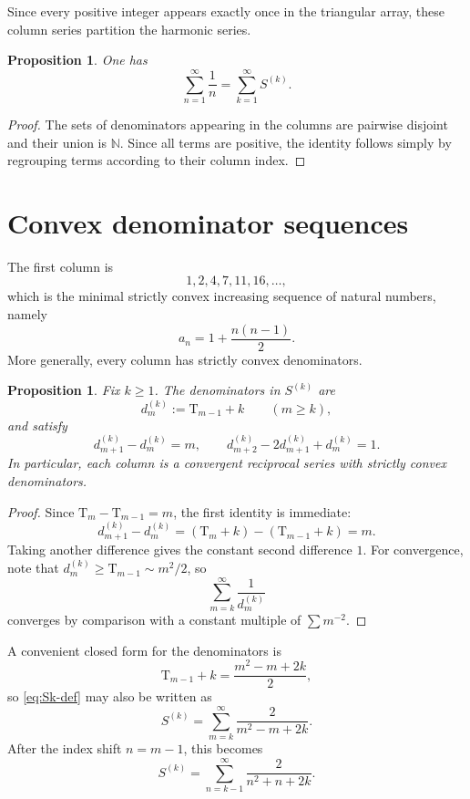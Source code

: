 \documentclass{article}
\theoremstyle{theorem}
\newtheorem{proposition}[theorem]{Proposition}
\theoremstyle{definition}
\newcommand{\N}{\mathbb{N}}
\newcommand{\T}{\mathrm{T}}
\begin{document}
Since every positive integer appears exactly once in the triangular array, these column series partition the harmonic series.

\begin{proposition}\label{prop:partition}
One has
\[
\sum_{n=1}^{\infty} \frac{1}{n} = \sum_{k=1}^{\infty} S^{(k)}.
\]
\end{proposition}

\begin{proof}
The sets of denominators appearing in the columns are pairwise disjoint and their union is $\N$. Since all terms are positive, the identity follows simply by regrouping terms according to their column index.
\end{proof}

\section{Convex denominator sequences}

The first column is
\[
1,2,4,7,11,16,\dots,
\]
which is the minimal strictly convex increasing sequence of natural numbers, namely
\[
a_n = 1 + \frac{n(n-1)}{2}.
\]
More generally, every column has strictly convex denominators.

\begin{proposition}\label{prop:convex}
Fix $k \ge 1$. The denominators in $S^{(k)}$ are
\[
d_m^{(k)} := \T_{m-1}+k \qquad (m \ge k),
\]
and satisfy
\[
d_{m+1}^{(k)} - d_m^{(k)} = m, \qquad d_{m+2}^{(k)} - 2d_{m+1}^{(k)} + d_m^{(k)} = 1.
\]
In particular, each column is a convergent reciprocal series with strictly convex denominators.
\end{proposition}

\begin{proof}
Since $\T_m-\T_{m-1}=m$, the first identity is immediate:
\[
d_{m+1}^{(k)} - d_m^{(k)} = (\T_m+k)-(\T_{m-1}+k)=m.
\]
Taking another difference gives the constant second difference $1$. For convergence, note that $d_m^{(k)} \ge \T_{m-1} \sim m^2/2$, so
\[
\sum_{m=k}^{\infty} \frac{1}{d_m^{(k)}}
\]
converges by comparison with a constant multiple of $\sum m^{-2}$.
\end{proof}

A convenient closed form for the denominators is
\[
\T_{m-1}+k = \frac{m^2-m+2k}{2},
\]
so \eqref{eq:Sk-def} may also be written as
\begin{equation}\label{eq:Sk-rational}
S^{(k)} = \sum_{m=k}^{\infty} \frac{2}{m^2-m+2k}.
\end{equation}
After the index shift $n=m-1$, this becomes
\begin{equation}\label{eq:Sk-shift}
S^{(k)} = \sum_{n=k-1}^{\infty} \frac{2}{n^2+n+2k}.
\end{equation}
\end{document}
